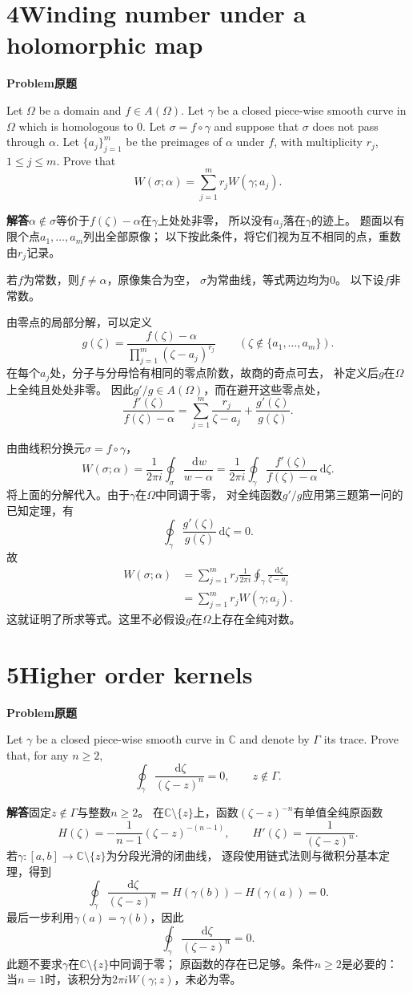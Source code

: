 \documentclass[11pt,a4paper]{ctexart}
\newcommand{\C}{\mathbb C}
\newcommand{\dd}{\,\mathrm d}
\newcommand{\problem}{\par\textbf{Problem\quad 原题}\par}
\newcommand{\solution}{\par\medskip\textbf{解答}\quad}
\begin{document}
\newpage
\section*{4\quad Winding number under a holomorphic map}
\problem
Let $\Omega$ be a domain and $f\in A(\Omega)$.
Let $\gamma$ be a closed piece-wise smooth curve in $\Omega$ which is homologous
to $0$. Let $\sigma=f\circ\gamma$ and suppose that $\sigma$ does not pass through
$\alpha$. Let $\{a_j\}_{j=1}^{m}$ be the preimages of $\alpha$ under $f$,
with multiplicity $r_j$, $1\le j\le m$. Prove that
\[
 W(\sigma;\alpha)=\sum_{j=1}^{m}r_jW(\gamma;a_j).
\]

\solution $\alpha\notin\sigma$等价于$f(\zeta)-\alpha$在$\gamma$上处处非零，
所以没有$a_j$落在$\gamma$的迹上。
题面以有限个点$a_1,\ldots,a_m$列出全部原像；
以下按此条件，将它们视为互不相同的点，重数由$r_j$记录。

若$f$为常数，则$f\ne\alpha$，原像集合为空，
$\sigma$为常曲线，等式两边均为$0$。
以下设$f$非常数。

由零点的局部分解，可以定义
\[
 g(\zeta)=\frac{f(\zeta)-\alpha}
                 {\prod_{j=1}^{m}(\zeta-a_j)^{r_j}}
 \qquad(\zeta\notin\{a_1,\ldots,a_m\}).
\]
在每个$a_j$处，分子与分母恰有相同的零点阶数，故商的奇点可去，
补定义后$g$在$\Omega$上全纯且处处非零。
因此$g'/g\in A(\Omega)$，而在避开这些零点处，
\[
 \frac{f'(\zeta)}{f(\zeta)-\alpha}
   =\sum_{j=1}^{m}\frac{r_j}{\zeta-a_j}+\frac{g'(\zeta)}{g(\zeta)}.
\]

由曲线积分换元$\sigma=f\circ\gamma$，
\[
 W(\sigma;\alpha)
  =\frac1{2\pi i}\oint_{\sigma}\frac{\dd w}{w-\alpha}
  =\frac1{2\pi i}\oint_{\gamma}
             \frac{f'(\zeta)}{f(\zeta)-\alpha}\dd\zeta.
\]
将上面的分解代入。由于$\gamma$在$\Omega$中同调于零，
对全纯函数$g'/g$应用第三题第一问的已知定理，有
\[
 \oint_{\gamma}\frac{g'(\zeta)}{g(\zeta)}\dd\zeta=0.
\]
故
\begin{align*}
 W(\sigma;\alpha)
 &=\sum_{j=1}^{m}r_j
       \frac1{2\pi i}\oint_{\gamma}\frac{\dd\zeta}{\zeta-a_j}\\
 &=\sum_{j=1}^{m}r_jW(\gamma;a_j).
\end{align*}
这就证明了所求等式。这里不必假设$g$在$\Omega$上存在全纯对数。

\newpage
\section*{5\quad Higher order kernels}
\problem
Let $\gamma$ be a closed piece-wise smooth curve in $\C$ and denote by $\Gamma$
its trace. Prove that, for any $n\ge2$,
\[
 \oint_{\gamma}\frac{\dd\zeta}{(\zeta-z)^n}=0,
 \qquad z\notin\Gamma.
\]

\solution 固定$z\notin\Gamma$与整数$n\ge2$。
在$\C\setminus\{z\}$上，函数$(\zeta-z)^{-n}$有单值全纯原函数
\[
 H(\zeta)=-\frac1{n-1}(\zeta-z)^{-(n-1)},\qquad
 H'(\zeta)=\frac1{(\zeta-z)^n}.
\]
若$\gamma:[a,b]\to\C\setminus\{z\}$为分段光滑的闭曲线，
逐段使用链式法则与微积分基本定理，得到
\[
 \oint_{\gamma}\frac{\dd\zeta}{(\zeta-z)^n}
   =H(\gamma(b))-H(\gamma(a))=0.
\]
最后一步利用$\gamma(a)=\gamma(b)$，因此
\[
 \boxed{\displaystyle
  \oint_{\gamma}\frac{\dd\zeta}{(\zeta-z)^n}=0.}
\]
此题不要求$\gamma$在$\C\setminus\{z\}$中同调于零；
原函数的存在已足够。条件$n\ge2$是必要的：
当$n=1$时，该积分为$2\pi iW(\gamma;z)$，未必为零。
\end{document}
